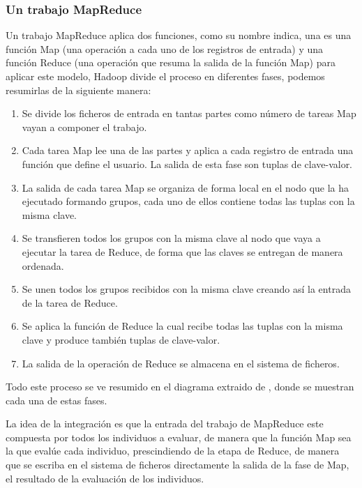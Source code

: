 \subsubsection{Un trabajo MapReduce}


Un trabajo MapReduce aplica dos funciones, como su nombre indica, una es una función Map (una operación a cada uno de los registros de entrada) y una función Reduce (una operación que resuma la salida de la función Map) para aplicar este modelo, Hadoop divide el proceso en diferentes fases, podemos resumirlas de la siguiente manera:

\begin{enumerate}
	\item Se divide los ficheros de entrada en tantas partes como n\'umero de tareas Map vayan a componer el trabajo.
	\item Cada tarea Map lee una de las partes y aplica a cada registro de entrada una función que define el usuario. La salida de esta fase son tuplas de clave-valor.
	\item La salida de cada tarea Map se organiza de forma local en el nodo que la ha ejecutado formando grupos, cada uno de ellos contiene todas las tuplas con la misma clave.
	\item Se transfieren todos los grupos con la misma clave al nodo que vaya a ejecutar la tarea de Reduce, de forma que las claves se entregan de manera ordenada.
	\item Se unen todos los grupos recibidos con la misma clave creando así la entrada de la tarea de Reduce.
	\item Se aplica la función de Reduce la cual recibe todas las tuplas con la misma clave y produce también tuplas de clave-valor.
	\item La salida de la operación de Reduce se almacena en el sistema de ficheros.
\end{enumerate}

Todo este proceso se ve resumido en el diagrama  extraido de \cite{cloudera-mapreduce}, donde se muestran cada una de estas fases.

\label{fase-map-eval}
La idea de la integración es que la entrada del trabajo de MapReduce este compuesta por todos los individuos a evaluar, de manera que la función Map sea la que evalúe cada individuo, prescindiendo de la etapa de Reduce, de manera que se escriba en el sistema de ficheros directamente la salida de la fase de Map, el resultado de la evaluación de los individuos.











